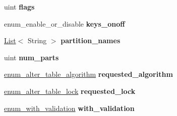 \begin{DoxyCompactItemize}
uint {\bfseries flags}
\item 
\mbox{\label{classAlter__info_aa6440a38f28240f424a645011078edaf}} 
enum\+\_\+enable\+\_\+or\+\_\+disable {\bfseries keys\+\_\+onoff}
\item 
\mbox{\label{classAlter__info_a45bd7cd0df1c7870c846ddd9505f2447}} 
\mbox{\hyperlink{classList}{List}}$<$ String $>$ {\bfseries partition\+\_\+names}
\item 
\mbox{\label{classAlter__info_ac9fecb19ad0e8004732100bd4ff60a3e}} 
uint {\bfseries num\+\_\+parts}
\item 
\mbox{\label{classAlter__info_a20ed2d17c97846b6f95df52317447403}} 
\mbox{\hyperlink{classAlter__info_a01de1481ff05e3f4fc1efb2f63c2274c}{enum\+\_\+alter\+\_\+table\+\_\+algorithm}} {\bfseries requested\+\_\+algorithm}
\item 
\mbox{\label{classAlter__info_aedb67139b75cece602d6694817818a1a}} 
\mbox{\hyperlink{classAlter__info_a10a92184da9b9d35060e9014fd4e0946}{enum\+\_\+alter\+\_\+table\+\_\+lock}} {\bfseries requested\+\_\+lock}
\item 
\mbox{\label{classAlter__info_a397285cb4ecee6f115a1c02dfbf35fc7}} 
\mbox{\hyperlink{classAlter__info_a4779e4302f27cfae682bf2e5a2e891a5}{enum\+\_\+with\+\_\+validation}} {\bfseries with\+\_\+validation}
\end{DoxyCompactItemize}
